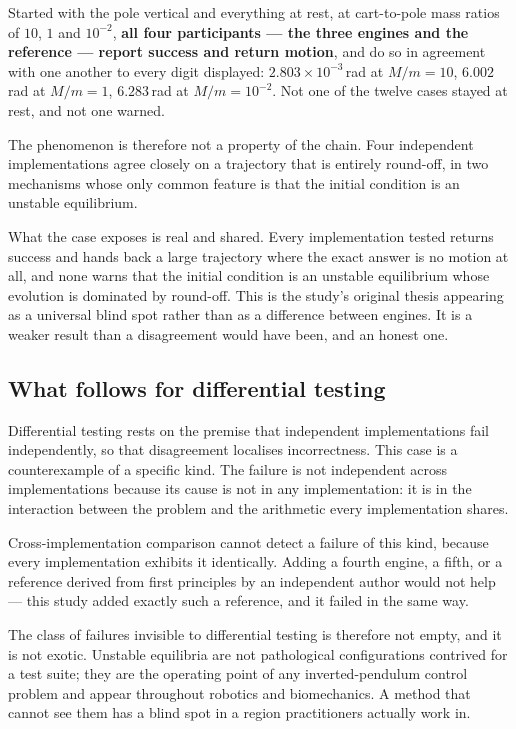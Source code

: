 \documentclass[review,12pt]{elsarticle}
\begin{document}
Started with the pole vertical and everything at rest, at cart-to-pole mass
ratios of $10$, $1$ and $10^{-2}$, \textbf{all four participants --- the three
engines and the reference --- report success and return motion}, and do so in
agreement with one another to every digit displayed: $2.803\times10^{-3}$\,rad at
$M/m=10$, $6.002$\,rad at $M/m=1$, $6.283$\,rad at $M/m=10^{-2}$. Not one of the
twelve cases stayed at rest, and not one warned.

The phenomenon is therefore not a property of the chain. Four independent
implementations agree closely on a trajectory that is entirely round-off, in
two mechanisms whose only common feature is that the initial condition is an
unstable equilibrium.

What the case exposes is real and shared. Every implementation tested returns
success and hands back a large trajectory where the exact answer is no motion at
all, and none warns that the initial condition is an unstable equilibrium whose
evolution is dominated by round-off. This is the study's original thesis
appearing as a universal blind spot rather than as a difference between engines.
It is a weaker result than a disagreement would have been, and an honest one.

\subsection{What follows for differential testing}
Differential testing rests on the premise that independent implementations fail
independently, so that disagreement localises incorrectness. This case is a
counterexample of a specific kind. The failure is not independent across
implementations because its cause is not in any implementation: it is in the
interaction between the problem and the arithmetic every implementation shares.

Cross-implementation comparison cannot detect a failure of this kind, because
every implementation exhibits it identically. Adding a fourth engine, a fifth,
or a reference derived from first principles by an independent author would not
help --- this study added exactly such a reference, and it failed in the same
way.

The class of failures invisible to differential testing is therefore not empty,
and it is not exotic. Unstable equilibria are not pathological configurations
contrived for a test suite; they are the operating point of any
inverted-pendulum control problem and appear throughout robotics and
biomechanics. A method that cannot see them has a blind spot in a region
practitioners actually work in.
\end{document}
